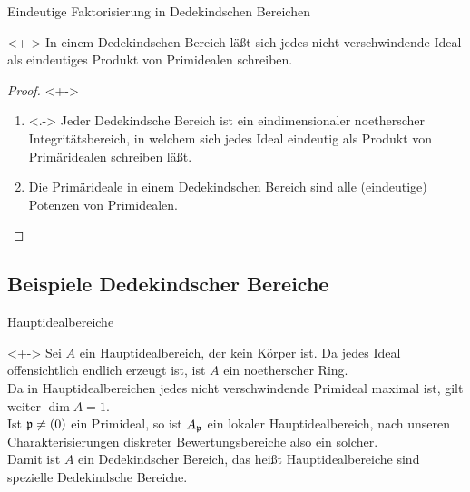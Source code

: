 \begin{frame}{Eindeutige Faktorisierung in Dedekindschen Bereichen}
	\begin{corollary}<+->
		In einem Dedekindschen Bereich läßt sich jedes nicht verschwindende Ideal als
		eindeutiges Produkt von Primidealen schreiben.
	\end{corollary}
	\begin{proof}<+->
		\begin{enumerate}[<+->]
		\item<.->
			Jeder Dedekindsche Bereich ist ein eindimensionaler noetherscher Integritätsbereich,
			in welchem sich jedes Ideal eindeutig als Produkt von Primäridealen schreiben läßt.
		\item
			Die Primärideale in einem Dedekindschen Bereich sind alle (eindeutige) Potenzen von Primidealen.
			\qedhere
		\end{enumerate}
	\end{proof}
\end{frame}

\subsection{Beispiele Dedekindscher Bereiche}

\begin{frame}{Hauptidealbereiche}
	\begin{example}<+->
		Sei \(A\) ein Hauptidealbereich, der kein Körper ist. Da jedes Ideal offensichtlich
		endlich erzeugt ist, ist \(A\) ein noetherscher Ring.
		\\
		Da in Hauptidealbereichen jedes nicht verschwindende Primideal maximal
		ist, gilt weiter \(\dim A = 1\).
		\\
		Ist \(\mathfrak{p} \neq (0)\) ein Primideal, so ist \(A_{\mathfrak{p}}\)
		ein lokaler Hauptidealbereich, nach unseren Charakterisierungen
		diskreter Bewertungsbereiche also ein solcher.
		\\
		Damit ist \(A\) ein Dedekindscher Bereich, das heißt Hauptidealbereiche
		sind spezielle Dedekindsche Bereiche.
	\end{example}
\end{frame}

